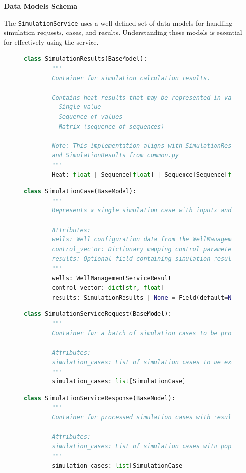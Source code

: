 \textbf{Data Models Schema}

The \texttt{SimulationService} uses a well-defined set of data models for handling simulation requests, cases, and results. Understanding these models is essential for effectively using the service. 

\begin{figure}[H]
	\begin{lstlisting}[language=Python, caption={SimulationResults Model}]
		class SimulationResults(BaseModel):
		"""
		Container for simulation calculation results.

		Contains heat results that may be represented in various formats:
		- Single value
		- Sequence of values
		- Matrix (sequence of sequences)

		Note: This implementation aligns with SimulationResultType
		and SimulationResults from common.py
		"""
		Heat: float | Sequence[float] | Sequence[Sequence[float] | float]
	\end{lstlisting}
\end{figure}

\begin{figure}[H]
	\begin{lstlisting}[language=Python, caption={SimulationCase Model}]
		class SimulationCase(BaseModel):
		"""
		Represents a single simulation case with inputs and optional results.

		Attributes:
		wells: Well configuration data from the WellManagement service
		control_vector: Dictionary mapping control parameters to their values
		results: Optional field containing simulation results when completed
		"""
		wells: WellManagementServiceResult
		control_vector: dict[str, float]
		results: SimulationResults | None = Field(default=None)
	\end{lstlisting}
\end{figure}

\begin{figure}[H]
	\begin{lstlisting}[language=Python, caption={SimulationServiceRequest Model}]
		class SimulationServiceRequest(BaseModel):
		"""
		Container for a batch of simulation cases to be processed.

		Attributes:
		simulation_cases: List of simulation cases to be executed
		"""
		simulation_cases: list[SimulationCase]
	\end{lstlisting}
\end{figure}

\begin{figure}[h]
	\begin{lstlisting}[language=Python, caption={SimulationServiceResponse Model}]
		class SimulationServiceResponse(BaseModel):
		"""
		Container for processed simulation cases with results.

		Attributes:
		simulation_cases: List of simulation cases with populated results
		"""
		simulation_cases: list[SimulationCase]
	\end{lstlisting}
\end{figure}

